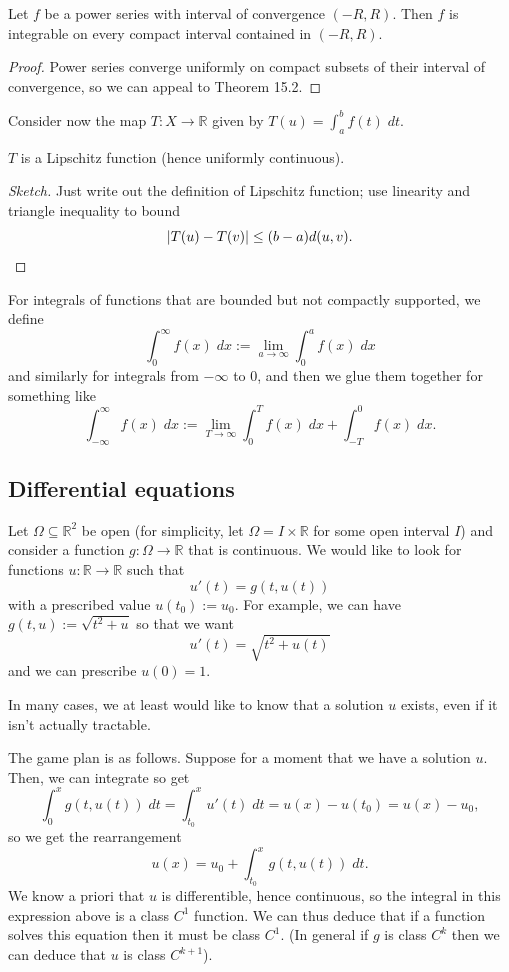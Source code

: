 \documentclass[10pt]{scrartcl}
\providecommand{\RR}{\mathbb R}
\providecommand{\dif}{\;d}
\begin{document}
\begin{corollary}
	Let $f$ be a power series with interval of convergence $(-R, R)$.
	Then $f$ is integrable on every compact interval contained in $(-R, R)$.
\end{corollary}

\begin{proof}
	Power series converge uniformly on compact subsets
	of their interval of convergence, so we can appeal to Theorem 15.2.
\end{proof}

Consider now the map $T\colon X\to\RR$ given by
$T(u) = \int_a^b f(t)\dif t$.

\begin{theorem}
	$T$ is a Lipschitz function (hence uniformly continuous).
\end{theorem}

\begin{proof}[Sketch]
	Just write out the definition of Lipschitz function;
	use linearity and triangle inequality to bound
	\[|T(u) - T(v)| \le (b-a)d(u, v).\qedhere\]
\end{proof}

For integrals of functions that are bounded but not compactly supported, we define
\[\int_0^\infty f(x)\dif x := \lim_{a\to\infty} \int_0^a f(x)\dif x\]
and similarly for integrals from $-\infty$ to $0$, and then we glue them together
for something like
\[\int_{-\infty}^\infty f(x)\dif x :=
\lim_{T\to\infty} \int_0^T f(x)\dif x + \int_{-T}^0 f(x)\dif x.\]

\subsection{Differential equations}
Let $\Omega\subseteq\RR^2$ be open
(for simplicity, let $\Omega = I\times\RR$ for some open interval $I$)
and consider a function $g\colon\Omega\to\RR$ that is continuous.
We would like to look for functions $u\colon\RR\to\RR$ such that
\[u'(t) = g(t, u(t))\]
with a prescribed value $u(t_0) := u_0$.
For example, we can have $g(t, u) := \sqrt{t^2 + u}$ so that we want
\[u'(t) = \sqrt{t^2 + u(t)}\]
and we can prescribe $u(0) = 1$.

In many cases, we at least would like to know that a solution $u$ exists,
even if it isn't actually tractable.

The game plan is as follows. Suppose for a moment that we have a solution $u$.
Then, we can integrate so get
\[\int_0^x g(t, u(t))\dif t = \int_{t_0}^x u'(t)\dif t  = u(x) - u(t_0)
= u(x) - u_0,\]
so we get the rearrangement
\[u(x) = u_0 + \int_{t_0}^x g(t, u(t))\dif t.\]
We know a priori that $u$ is differentible, hence continuous,
so the integral in this expression above is a class $C^1$ function.
We can thus deduce that if a function solves this equation
then it must be class $C^1$.
(In general if $g$ is class $C^k$ then we can deduce that
$u$ is class $C^{k+1}$).
\end{document}
